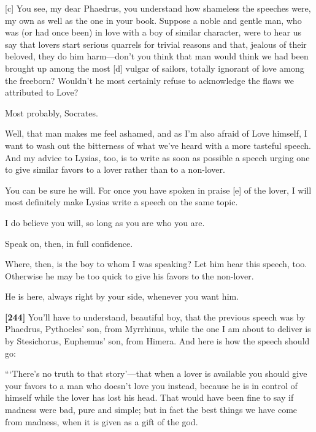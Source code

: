 {[}c{]} \saysocrates You see, my dear Phaedrus, you understand how
shameless the speeches were, my own as well as the one in your book.
Suppose a noble and gentle man, who was (or had once been) in love with
a boy of similar character, were to hear us say that lovers start
serious quarrels for trivial reasons and that, jealous of their beloved,
they do him harm---don't you think that man would think we had been
brought up among the most {[}d{]} vulgar of sailors, totally ignorant of
love among the freeborn? Wouldn't he most certainly refuse to
acknowledge the flaws we attributed to Love?

\sayphaedrus Most probably, Socrates.

\saysocrates Well, that man makes me feel ashamed, and as I'm also afraid
of Love himself, I want to wash out the bitterness of what we've heard
with a more tasteful speech. And my advice to Lysias, too, is to write
as soon as possible a speech urging one to give similar favors to a
lover rather than to a non-lover.

\sayphaedrus You can be sure he will. For once you have spoken in praise
{[}e{]} of the lover, I will most definitely make Lysias write a speech
on the same topic.

\saysocrates I do believe you will, so long as you are who you are.

\sayphaedrus Speak on, then, in full confidence.

\saysocrates Where, then, is the boy to whom I was speaking? Let him hear
this speech, too. Otherwise he may be too quick to give his favors to
the non-lover.

\sayphaedrus He is here, always right by your side, whenever you want him.

{\bf {[}244{]}} \saysocrates You'll have to understand, beautiful boy, that
the previous speech was by Phaedrus, Pythocles' son, from Myrrhinus,
while the one I am about to deliver is by Stesichorus, Euphemus' son,
from Himera. And here
is how the speech should go:

“‘There's no truth to that story'---that when a lover is available you
should give your favors to a man who doesn't love you instead, because
he is in control of himself while the lover has lost his head. That
would have been fine to say if madness were bad, pure and simple; but in
fact the best things we have come from madness, when it is given as a
gift of the god.

